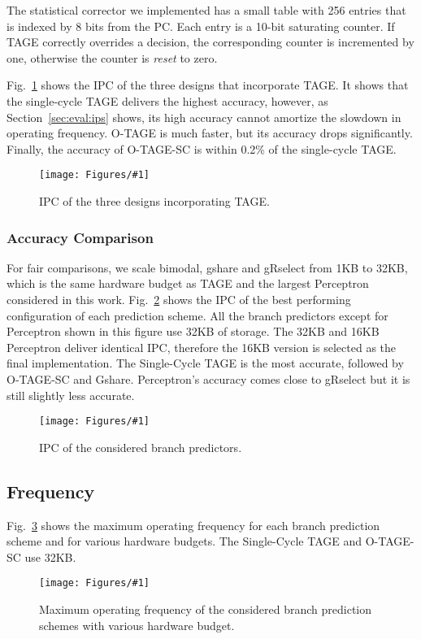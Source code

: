 \documentclass[conference]{IEEEtran}
\newcommand{\kfig}[4]{ %
        \begin{figure}[!t]
        \centering
        \texttt{[image: Figures/\#1]}
        \vspace{-1mm}
        \caption{#3}
        \label{#2}
        \end{figure}
}
\begin{document}
The statistical corrector we implemented has a small table with 256 entries that is indexed by 8 bits from the PC. Each entry is a 10-bit saturating counter. If TAGE correctly overrides a decision, the corresponding counter is incremented by one, otherwise the counter is \textit{reset} to zero.

Fig.~\ref{fig:tageIPC} shows the IPC of the three designs that incorporate TAGE. It shows that the single-cycle TAGE delivers the highest accuracy, however, as Section~\ref{sec:eval:ips} shows, its high accuracy cannot amortize the slowdown in operating frequency. O-TAGE is much faster, but its accuracy drops significantly. Finally, the accuracy of \mbox{O-TAGE-SC} is within 0.2\% of the single-cycle TAGE.
\kfig{tageIPC.pdf}{fig:tageIPC}{IPC of the three designs incorporating TAGE.}{angle = 0, trim = 1.1in 1.5in 0.9in 1.5in, clip, width=0.4\textwidth}


\subsubsection{Accuracy Comparison}
\label{sec:eval:ipc:comparison}
For fair comparisons, we scale bimodal, gshare and gRselect from 1KB to 32KB, which is the same hardware budget as TAGE and the largest Perceptron considered in this work. Fig.~\ref{fig:adipc} shows the IPC of the best performing configuration of each prediction scheme. All the branch predictors except for Perceptron shown in this figure use 32KB of storage. The 32KB and 16KB Perceptron deliver identical IPC, therefore the 16KB version is selected as the final implementation. The Single-Cycle TAGE is the most accurate, followed by \mbox{O-TAGE-SC} and Gshare. Perceptron's accuracy comes close to gRselect but it is still slightly less accurate.
\kfig{adipc.pdf}{fig:adipc}{IPC of the considered branch predictors.}{angle = 0, trim = 0.9in 2.3in 0.9in 2.3in, clip, width=0.4\textwidth}


\subsection{Frequency}
\label{sec:eval:fmax}
Fig.~\ref{fig:adfmax} shows the maximum operating frequency for each branch prediction scheme and for various hardware budgets. The Single-Cycle TAGE and \mbox{O-TAGE-SC} use 32KB.
\kfig{adfmax.pdf}{fig:adfmax}{Maximum operating frequency of the considered branch prediction schemes with various hardware budget.}{angle = 0, trim = 0.7in 4.5in 0.7in 4.5in, clip, width=0.5\textwidth}
\end{document}
